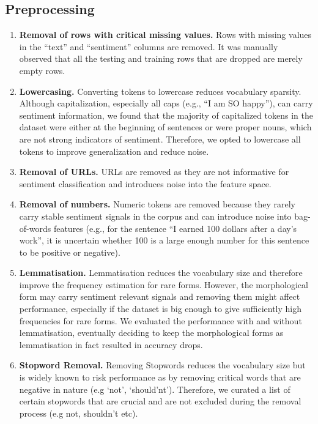 \documentclass[11pt]{article}
\begin{document}
\subsection{Preprocessing}
\begin{enumerate}
    \item \textbf{Removal of rows with critical missing values.} Rows with missing values in the ``text'' and ``sentiment'' columns are removed. It was manually observed that all the testing and training rows that are dropped are merely empty rows.
    \item \textbf{Lowercasing.} Converting tokens to lowercase reduces vocabulary sparsity. Although capitalization, especially all caps (e.g., ``I am SO happy''), can carry sentiment information, we found that the majority of capitalized tokens in the dataset were either at the beginning of sentences or were proper nouns, which are not strong indicators of sentiment. Therefore, we opted to lowercase all tokens to improve generalization and reduce noise.
    \item \textbf{Removal of URLs.} URLs are removed as they are not informative for sentiment classification and introduces noise into the feature space.
    \item \textbf{Removal of numbers.} Numeric tokens are removed because they rarely carry stable sentiment signals in the corpus and can introduce noise into bag-of-words features (e.g., for the sentence ``I earned 100 dollars after a day's work'', it is uncertain whether 100 is a large enough number for this sentence to be positive or negative). 
    
    \item \textbf{Lemmatisation.} Lemmatisation reduces the vocabulary size and therefore improve the frequency estimation for rare forms. However, the morphological form may carry sentiment relevant signals and removing them might affect performance, especially if the dataset is big enough to give sufficiently high frequencies for rare forms. We evaluated the performance with and without lemmatisation, eventually deciding to keep the morphological forms as lemmatisation in fact resulted in accuracy drops. 
    \item \textbf{Stopword Removal.} Removing Stopwords reduces the vocabulary size but is widely known to risk performance as by removing critical words that are negative in nature (e.g `not', `should'nt'). Therefore, we curated a list of certain stopwords that are crucial and are not excluded during the removal process (e.g not, shouldn't etc). 
\end{enumerate}
\end{document}
